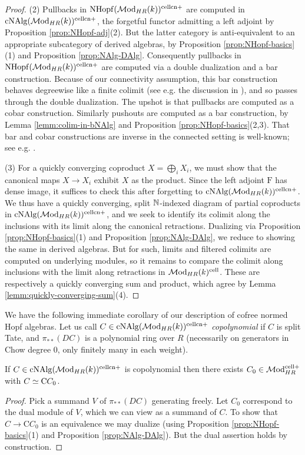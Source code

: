 \documentclass{amsart}
\numberwithin{proposition}{section}
\numberwithin{equation}{section}
\def\cell{\mathrm{cell}}
\def\NHopf{\mathrm{NHopf}}
\def\cNAlg{\mathrm{cNAlg}}
\def\cn{\mathrm{cn}}
\def\Free{\mathrm{F}}
\def\Cofree{\mathrm{C}}
\begin{document}
\begin{proof}
(2) Pullbacks in $\NHopf(\Mod_{HR}(k))^{\cell\cn+}$ are computed in $\cNAlg(\Mod_{HR}(k))^{\cell\cn+}$, the forgetful functor admitting a left adjoint by Proposition \ref{prop:NHopf-adj}(2).
But the latter category is anti-equivalent to an appropriate subcategory of derived algebras, by Proposition \ref{prop:NHopf-basics}(1) and Proposition \ref{prop:NAlg-DAlg}.
Consequently pullbacks in $\NHopf(\Mod_{HR}(k))^{\cell\cn+}$ are computed via a double dualization and a bar construction.
Because of our connectivity assumption, this bar construction behaves degreewise like a finite colimit (see e.g. the discussion in \cite[\S2.2.2]{bachmann-wilson}), and so passes through the double dualization.
The upshot is that pullbacks are computed as a cobar construction.
Similarly pushouts are computed as a bar construction, by Lemma \ref{lemm:colim-in-bNAlg} and Proposition \ref{prop:NHopf-basics}(2,3).
That bar and cobar constructions are inverse in the connected setting is well-known; see e.g. \cite[Remark 2.17]{bachmann-wilson}.

(3) For a quickly converging coproduct $X = \bigoplus_i X_i$, we must show that the canonical maps $X \to X_i$ exhibit $X$ as the product.
Since the left adjoint $\Free$ has dense image, it suffices to check this after forgetting to $\cNAlg(\Mod_{HR}(k))^{\cell\cn+}$.
We thus have a quickly converging, split $\mathbb{N}$-indexed diagram of partial coproducts in $\cNAlg(\Mod_{HR}(k))^{\cell\cn+}$, and we seek to identify its colimit along the inclusions with its limit along the canonical retractions.
Dualizing via Proposition \ref{prop:NHopf-basics}(1) and Proposition \ref{prop:NAlg-DAlg}, we reduce to showing the same in derived algebras.
But for such, limits and filtered colimits are computed on underlying modules, so it remains to compare the colimit along inclusions with the limit along retractions in $\Mod_{HR}(k)^\cell$. These are respectively a quickly converging sum and product, which agree by Lemma \ref{lemm:quickly-converging-sum}(4).
\end{proof}

We have the following immediate corollary of our description of cofree normed Hopf algebras.
Let us call $C \in \cNAlg(\Mod_{HR}(k))^{\cell\cn+}$ \emph{copolynomial} if $C$ is split Tate, and $\pi_{**}(DC)$ is a polynomial ring over $R$ (necessarily on generators in Chow degree $0$, only finitely many in each weight).
\begin{lemma} \label{lemm:maps-into-copoly}
If $C \in \cNAlg(\Mod_{HR}(k))^{\cell\cn+}$ is copolynomial then there exists $C_0 \in \Mod_{HR}^{\cell+}$ with $C \wequi \Cofree C_0$.
\end{lemma}
\begin{proof}
Pick a summand $V$ of $\pi_{**}(DC)$ generating freely.
Let $C_0$ correspond to the dual module of $V$, which we can view as a summand of $C$.
To show that $C \to \Cofree C_0$ is an equivalence we may dualize (using Proposition \ref{prop:NHopf-basics}(1) and Proposition \ref{prop:NAlg-DAlg}).
But the dual assertion holds by construction.
\end{proof}
\end{document}
